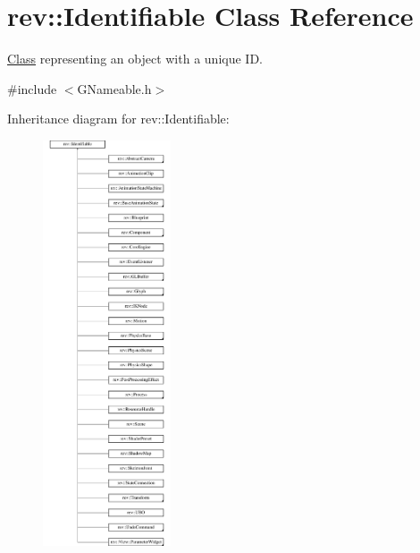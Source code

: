 \hypertarget{classrev_1_1_identifiable}{}\section{rev\+::Identifiable Class Reference}
\label{classrev_1_1_identifiable}


\mbox{\hyperlink{struct_class}{Class}} representing an object with a unique ID.  




{\ttfamily \#include $<$G\+Nameable.\+h$>$}

Inheritance diagram for rev\+::Identifiable\+:\begin{figure}[H]
\begin{center}
\leavevmode
\includegraphics[height=12.000000cm]{classrev_1_1_identifiable}
\end{center}
\end{figure}
